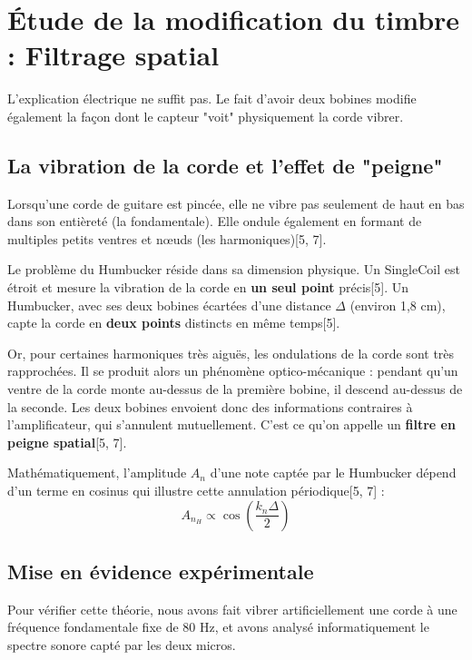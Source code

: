 \documentclass[11pt, a4paper]{article}
\begin{document}
\section{Étude de la modification du timbre : Filtrage spatial}

L'explication électrique ne suffit pas. Le fait d'avoir deux bobines modifie également la façon dont le capteur "voit" physiquement la corde vibrer.

\subsection{La vibration de la corde et l'effet de "peigne"}
Lorsqu'une corde de guitare est pincée, elle ne vibre pas seulement de haut en bas dans son entièreté (la fondamentale). Elle ondule également en formant de multiples petits ventres et nœuds (les harmoniques)[5, 7]. 

Le problème du Humbucker réside dans sa dimension physique. Un SingleCoil est étroit et mesure la vibration de la corde en \textbf{un seul point} précis[5]. Un Humbucker, avec ses deux bobines écartées d'une distance $\Delta$ (environ 1,8 cm), capte la corde en \textbf{deux points} distincts en même temps[5]. 

Or, pour certaines harmoniques très aiguës, les ondulations de la corde sont très rapprochées. Il se produit alors un phénomène optico-mécanique : pendant qu'un ventre de la corde monte au-dessus de la première bobine, il descend au-dessus de la seconde. Les deux bobines envoient donc des informations contraires à l'amplificateur, qui s'annulent mutuellement. C'est ce qu'on appelle un \textbf{filtre en peigne spatial}[5, 7].

Mathématiquement, l'amplitude $A_n$ d'une note captée par le Humbucker dépend d'un terme en cosinus qui illustre cette annulation périodique[5, 7] :
\begin{equation}
A_{n_H} \propto \cos\left(\frac{k_n\Delta}{2}\right)
\end{equation}

\subsection{Mise en évidence expérimentale}
Pour vérifier cette théorie, nous avons fait vibrer artificiellement une corde à une fréquence fondamentale fixe de 80 Hz, et avons analysé informatiquement le spectre sonore capté par les deux micros.
\end{document}
